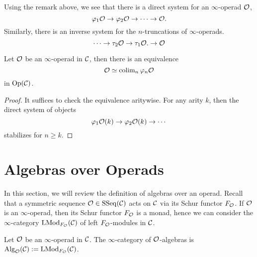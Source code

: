 \begin{remark}
	Using the remark above, we see that there is a direct system for an $\infty$-operad ${\mathcal{O}}$, 
\begin{equation}
\varphi_1{\mathcal{O}} \to \varphi_2{\mathcal{O}} \to \cdots \to {\mathcal{O}}.
\end{equation}
Similarly, there is an inverse system for the $n$-truncations of $\infty$-operads.
\begin{equation}
\cdots \to 
\tau_2 {\mathcal{O}}
\to 
\tau_1 {\mathcal{O}}.
\to 
{\mathcal{O}}
\end{equation}
\end{remark}



\begin{proposition}
\label{Operad as a colimits}
	Let ${\mathcal{O}}$ be an $\infty$-operad in ${\mathcal{C}}$, 
	then there is an equivalence
	\[
	{\mathcal{O}} \simeq
	\operatorname{colim}_n \varphi_n {\mathcal{O}}
	\]
	in $\operatorname{Op}({\mathcal{C}})$.
\end{proposition}
\begin{proof}
    It suffices to check the equivalence aritywise.
    For any arity $k$, then the direct system of objects 
    $$
    \varphi_1{\mathcal{O}}(k) \to \varphi_2{\mathcal{O}}(k) \to \cdots    
    $$
    stabilizes for $n \geq k$.
\end{proof}





\section{Algebras over Operads}
In this section, we will review the definition of algebras over an operad.
Recall that a symmetric sequence ${\mathcal{O}}\in\operatorname{SSeq}({\mathcal{C}})$ acts on ${\mathcal{C}}$ via its Schur functor $F_{{\mathcal{O}}}$.
If ${\mathcal{O}}$ is an $\infty$-operad, then its Schur functor $F_{\mathcal{O}}$ is a monad, hence we can consider the $\infty$-category $\operatorname{LMod}_{F_{\mathcal{O}}}({\mathcal{C}})$ of left $F_{\mathcal{O}}$-modules in ${\mathcal{C}}$.
\begin{definition}
	\label{algebras over an operad}
	Let ${\mathcal{O}}$ be an $\infty$-operad in ${\mathcal{C}}$. The $\infty$-category of ${\mathcal{O}}$-algebras is $\operatorname{Alg}_{{\mathcal{O}}}({\mathcal{C}}):= \operatorname{LMod}_{F_{\mathcal{O}}}({\mathcal{C}})$.
\end{definition}

